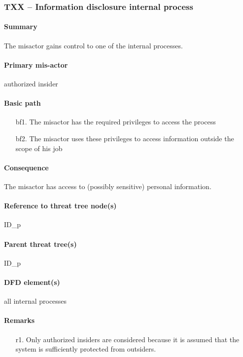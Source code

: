 \subsubsection{TXX -- Information disclosure internal process} %
\paragraph{Summary} The misactor gains control to one of the internal processes.

\paragraph{Primary mis-actor} authorized insider

\paragraph{Basic path}
\begin{enumerate}
	\item[bf1.]{The misactor has the required privileges to access the process}
	\item[bf2.]{The misactor uses these privileges to access information outside
	the scope of his job}
\end{enumerate}

\paragraph{Consequence} The misactor has access to (possibly sensitive)
personal information.

\paragraph{Reference to threat tree node(s)} ID_p

\paragraph{Parent threat tree(s)} ID_p

\paragraph{DFD element(s)} all internal processes

\paragraph{Remarks}
\begin{enumerate}
     \item[r1.] Only authorized insiders are considered because it is assumed
     that the system is sufficiently protected from outsiders. 
\end{enumerate}
